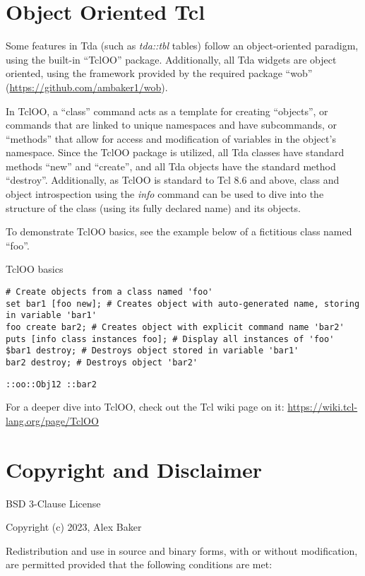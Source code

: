 \clearpage
\section{Object Oriented Tcl}
Some features in Tda (such as \textit{tda::tbl} tables) follow an object-oriented paradigm, using the built-in ``TclOO'' package. 
Additionally, all Tda widgets are object oriented, using the framework provided by the required package ``wob'' (\url{https://github.com/ambaker1/wob}).

In TclOO, a ``class'' command acts as a template for creating ``objects'', or commands that are linked to unique namespaces and have subcommands, or ``methods'' that allow for access and modification of variables in the object's namespace.
Since the TclOO package is utilized, all Tda classes have standard methods ``new'' and ``create'', and all Tda objects have the standard method ``destroy''.
Additionally, as TclOO is standard to Tcl 8.6 and above, class and object introspection using the \textit{info} command can be used to dive into the structure of the class (using its fully declared name) and its objects.

To demonstrate TclOO basics, see the example below of a fictitious class named ``foo''.
\begin{example}{TclOO basics}
\begin{lstlisting}
# Create objects from a class named 'foo'
set bar1 [foo new]; # Creates object with auto-generated name, storing in variable 'bar1'
foo create bar2; # Creates object with explicit command name 'bar2'
puts [info class instances foo]; # Display all instances of 'foo'
$bar1 destroy; # Destroys object stored in variable 'bar1'
bar2 destroy; # Destroys object 'bar2'
\end{lstlisting}
\tcblower
\begin{lstlisting}
::oo::Obj12 ::bar2
\end{lstlisting}
\end{example}
For a deeper dive into TclOO, check out the Tcl wiki page on it: \url{https://wiki.tcl-lang.org/page/TclOO}

\cleartooddpage[\thispagestyle{empty}]
\section{Copyright and Disclaimer}
BSD 3-Clause License

Copyright (c) 2023, Alex Baker

Redistribution and use in source and binary forms, with or without
modification, are permitted provided that the following conditions are met:

